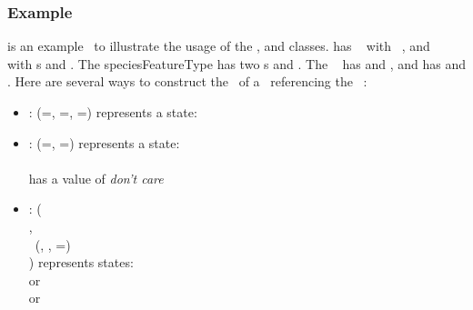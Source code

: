 \subsubsection{Example}
\label{def:SpeciesFeature:Example}

 is an example \speciesType\ to illustrate the usage of the \ListOfSpeciesFeatures, \SubListOfSpeciesFeatures and \SpeciesFeature classes.   has \speciesTypeInstance\  with \speciesFeatureType\ , and \speciesTypeInstance\  with \speciesFeatureType s  and . The speciesFeatureType  has two \possibleSpeciesFeatureValue s  and . The \speciesFeatureType\  has  and , and  has  and . Here are several ways to construct the \listOfSpeciesFeatures\ of a \species\ referencing the \speciesType\ :
\begin{itemize}
 \item 
    : \listOfSpeciesFeatures (=, =,  =) represents a state: \\ 
 \item 
     : \listOfSpeciesFeatures (=, =) represents a state:\\ 
     \\
     has a value of \emph{don't care}
 \item 
    : \listOfSpeciesFeatures (\\
   \parindent 20pt 
   \indent {},\\
   \indent \subListOfSpeciesFeatures\ (,  , =)\\
 ) represents states: \\ 
    or \\
    or \\
\end{itemize}

\clearpage

